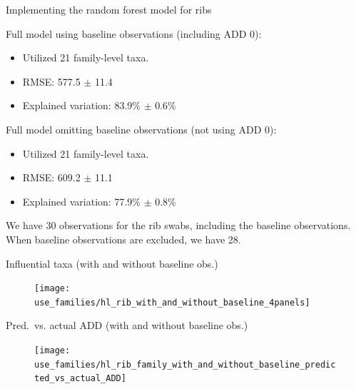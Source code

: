 \documentclass{beamer}
\begin{document}
\begin{frame}{Implementing the random forest model for ribs}

Full model using baseline observations (including ADD 0):
\begin{itemize}
  \item Utilized 21 family-level taxa.
  \item RMSE: 577.5 $\pm$  11.4
  \item Explained variation: 83.9\%
$\pm$ 0.6\%
\end{itemize}

\vspace{0.1in}

Full model omitting baseline observations (not using ADD 0):
\begin{itemize}
  \item Utilized 21 family-level taxa.
  \item RMSE: 609.2 $\pm$ 11.1
  \item Explained variation: 77.9\% $\pm$ 0.8\%
\end{itemize}

\vspace{0.1in}

\noindent We have 30 observations for the rib swabs, including the baseline
observations.  When baseline observations are excluded, we have 28. 

\end{frame}



\begin{frame}{Influential taxa (with and without baseline obs.)}

  \begin{center}
    \begin{figure}
      \texttt{[image: use\_families/hl\_rib\_with\_and\_without\_baseline\_4panels]}
    \end{figure}
  \end{center}
  \vspace{-0.1in}

\end{frame}


\begin{frame}{Pred.\ vs. actual ADD (with and without baseline obs.)}

  \begin{center}
    \begin{figure}
      \texttt{[image: use\_families/hl\_rib\_family\_with\_and\_without\_baseline\_predicted\_vs\_actual\_ADD]}
    \end{figure}
  \end{center}
  \vspace{-0.1in}

\end{frame}
\end{document}
